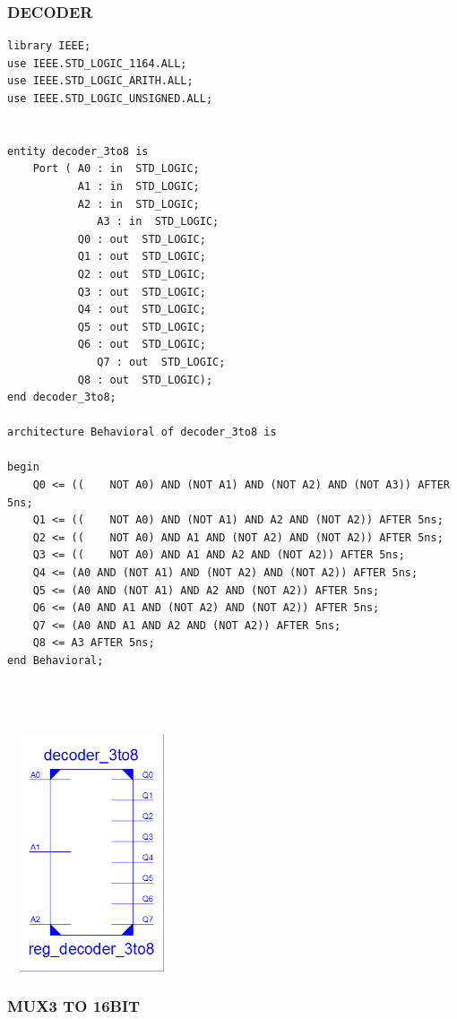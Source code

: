 \documentclass{article}
\begin{document}
\pagebreak
\subsubsection{DECODER}\label{sec:result}
\begin{lstlisting}
library IEEE;
use IEEE.STD_LOGIC_1164.ALL;
use IEEE.STD_LOGIC_ARITH.ALL;
use IEEE.STD_LOGIC_UNSIGNED.ALL;


entity decoder_3to8 is
    Port ( A0 : in  STD_LOGIC;
           A1 : in  STD_LOGIC;
           A2 : in  STD_LOGIC;
			  A3 : in  STD_LOGIC;
           Q0 : out  STD_LOGIC;
           Q1 : out  STD_LOGIC;
           Q2 : out  STD_LOGIC;
           Q3 : out  STD_LOGIC;
           Q4 : out  STD_LOGIC;
           Q5 : out  STD_LOGIC;
           Q6 : out  STD_LOGIC;
			  Q7 : out  STD_LOGIC;
           Q8 : out  STD_LOGIC);
end decoder_3to8;

architecture Behavioral of decoder_3to8 is

begin
	Q0 <= ((	NOT A0) AND (NOT A1) AND (NOT A2) AND (NOT A3)) AFTER 5ns;
	Q1 <= ((	NOT A0) AND (NOT A1) AND A2 AND (NOT A2)) AFTER 5ns;
	Q2 <= ((	NOT A0) AND A1 AND (NOT A2) AND (NOT A2)) AFTER 5ns;
	Q3 <= ((	NOT A0) AND A1 AND A2 AND (NOT A2)) AFTER 5ns;
	Q4 <= (A0 AND (NOT A1) AND (NOT A2) AND (NOT A2)) AFTER 5ns;
	Q5 <= (A0 AND (NOT A1) AND A2 AND (NOT A2)) AFTER 5ns;
	Q6 <= (A0 AND A1 AND (NOT A2) AND (NOT A2)) AFTER 5ns;
	Q7 <= (A0 AND A1 AND A2 AND (NOT A2)) AFTER 5ns;
	Q8 <= A3 AFTER 5ns;
end Behavioral;




\end{lstlisting}

\includegraphics[width=5cm, height=7cm]{decoder.png}
\pagebreak
\subsubsection{MUX3 TO 16BIT}\label{sec:result}
\end{document}
